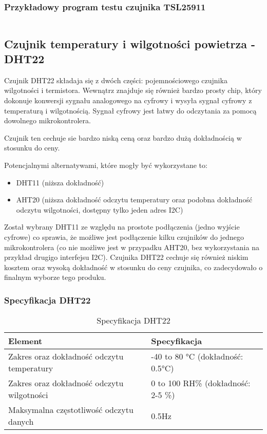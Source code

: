 \documentclass[12pt,a4paper]{article}
\begin{document}
\subsubsection{Przykładowy program testu czujnika TSL25911}

\begin{code}[H]
    \inputminted[frame=lines,]{c}{../proj/tsl2591-test/tsl2591-test.ino}

    \caption{Test czujnika TSL25911}
\end{code}

\subsection{Czujnik temperatury i wilgotności powietrza - DHT22}

Czujnik DHT22 składaja się z dwóch części: pojemnościowego czujnika wilgotności i termistora. 
Wewnątrz znajduje się również bardzo prosty chip, który dokonuje konwersji sygnału analogowego na cyfrowy i wysyła sygnał cyfrowy z temperaturą i wilgotnością. 
Sygnał cyfrowy jest łatwy do odczytania za pomocą dowolnego mikrokontrolera.

Czujnik ten cechuje sie bardzo niską ceną oraz bardzo dużą dokładnością w stosunku do ceny.

Potencjalnymi alternatywami, które mogły być wykorzystane to:
\begin{itemize}
    \item DHT11 (niższa dokładność)
    \item AHT20 (niższa dokładność odczytu temperatury oraz podobna dokładność odczytu wilgotności, dostępny tylko jeden adres I2C)
\end{itemize}

Został wybrany DHT11 ze względu na prostote podłączenia (jedno wyjście cyfrowe) co sprawia, że możliwe jest podłączenie
kilku czujników do jednego mikrokontrolera (co nie możliwe jest w przypadku AHT20, bez wykorzystania na przykład drugigo interfejsu I2C).
Czujnika DHT22 cechuje się również niskim kosztem oraz wysoką dokładność w stosunku do ceny czujnika, co zadecydowało o finalnym wyborze tego produku. 

\subsubsection{Specyfikacja DHT22}

\begin{table}[H]
    \centering
    \begin{tabular}{|l|l|}
        \hline
        Element & Specyfikacja \\
        \hline
        Zakres oraz dokładność odczytu temperatury & -40 to 80 °C (dokładność: 0.5°C) \\
        \hline
        Zakres oraz dokładność odczytu wilgotności & 0 to 100 RH\% (dokładność: 2-5 \%) \\
        \hline
        Maksymalna częstotliwość odczytu danych & 0.5Hz \\
        \hline
    \end{tabular}
    \caption{Specyfikacja DHT22}
    \label{dht22-spec}
\end{table}
\end{document}

